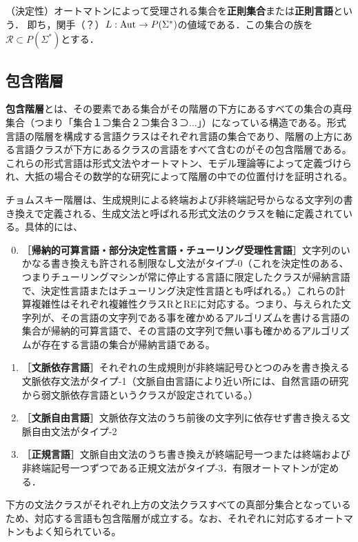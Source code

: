 \documentclass[uplatex, dvipdfmx]{jsreport}
\begin{document}
\begin{definition}
    （決定性）オートマトンによって受理される集合を\textbf{正則集合}または\textbf{正則言語}という．
    即ち，関手（？）$L:\mathrm{Aut}\to P(\Sigma^*)$の値域である．この集合の族を$\mathcal{R}\subset P(\Sigma^*)$とする．
\end{definition}

\subsection{包含階層}

\begin{definition}[Hierarchy]
    \textbf{包含階層}とは、その要素である集合がその階層の下方にあるすべての集合の真母集合（つまり「集合１⊃集合２⊃集合３⊃...」）になっている構造である。形式言語の階層を構成する言語クラスはそれぞれ言語の集合であり、階層の上方にある言語クラスが下方にあるクラスの言語をすべて含むのがその包含階層である。これらの形式言語は形式文法やオートマトン、モデル理論等によって定義づけられ、大抵の場合その数学的な研究によって階層の中での位置付けを証明される。
\end{definition}
\begin{example}
    チョムスキー階層は、生成規則による終端および非終端記号からなる文字列の書き換えで定義される、生成文法と呼ばれる形式文法のクラスを軸に定義されている。具体的には、
    \begin{enumerate}\setcounter{enumi}{-1}
        \item ［\textbf{帰納的可算言語・部分決定性言語・チューリング受理性言語}］文字列のいかなる書き換えも許される制限なし文法がタイプ-0（これを決定性のある、つまりチューリングマシンが常に停止する言語に限定したクラスが帰納言語で、決定性言語またはチューリング決定性言語とも呼ばれる。）これらの計算複雑性はそれぞれ複雑性クラスRとREに対応する。つまり、与えられた文字列が、その言語の文字列である事を確かめるアルゴリズムを書ける言語の集合が帰納的可算言語で、その言語の文字列で無い事も確かめるアルゴリズムが存在する言語の集合が帰納言語である。
        \item ［\textbf{文脈依存言語}］それぞれの生成規則が非終端記号ひとつのみを書き換える文脈依存文法がタイプ-1（文脈自由言語により近い所には、自然言語の研究から弱文脈依存言語というクラスが設定されている。）
        \item ［\textbf{文脈自由言語}］文脈依存文法のうち前後の文字列に依存せず書き換える文脈自由文法がタイプ-2
        \item ［\textbf{正規言語}］文脈自由文法のうち書き換えが終端記号一つまたは終端および非終端記号一つずつである正規文法がタイプ-3．有限オートマトンが定める．
    \end{enumerate}
    下方の文法クラスがそれぞれ上方の文法クラスすべての真部分集合となっているため、対応する言語も包含階層が成立する。なお、それぞれに対応するオートマトンもよく知られている。
\end{example}
\end{document}
